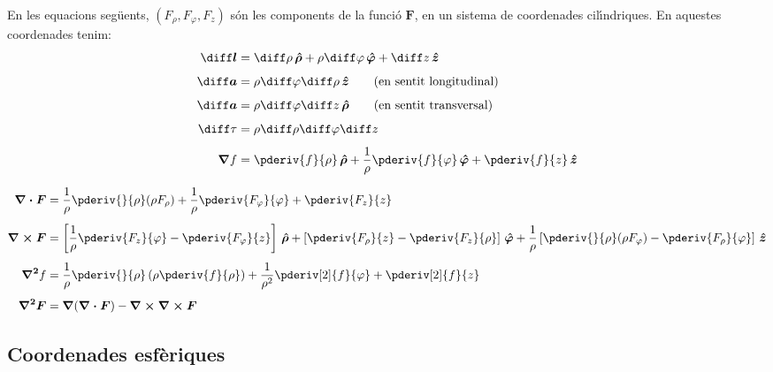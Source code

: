 \documentclass[catalan,a4paper,twoside,11pt]{article}
\begin{document}
\renewcommand{\va}{\ensuremath{\,\boldsymbol{\hat{\rho}}}}
\renewcommand{\vb}{\ensuremath{\,\boldsymbol{\hat{\varphi}}}}
\renewcommand{\vc}{\ensuremath{\,\boldsymbol{\hat{z}}}}
En les equacions seg\"{u}ents, $(F_\rho,F_\varphi,F_z)$  s\'{o}n les
components de la funci\'{o}  $\boldsymbol{F}$, en un sistema de
coordenades cil\'{\i}ndriques. En aquestes coordenades tenim:
\begin{align}
    \boldsymbol{\diff l} &= \diff \rho \va + \rho\diff \varphi \vb + \diff z \vc\\[1ex]
    \boldsymbol{\diff a} &= \rho\diff \varphi \diff \rho \vc \qquad\text{(en sentit longitudinal)}\\[1ex]
    \boldsymbol{\diff a} &= \rho\diff \varphi \diff z \va \qquad\text{(en sentit transversal)}\\[1ex]
    \diff\tau &= \rho \diff \rho \diff \varphi \diff z\\[1ex]
    \boldsymbol{\nabla}f &= \pderiv{f}{\rho}\va + \frac{1}{\rho}\pderiv{f}{\varphi}\vb
    + \pderiv{f}{z}\vc
\end{align}

\begin{align}
    \boldsymbol{\nabla\cdot F} &= \frac{1}{\rho}\pderiv{}{\rho}(\rho F_\rho) +
    \frac{1}{\rho}\pderiv{F_\varphi}{\varphi}+ \pderiv{F_z}{z}\\[1ex]
    \boldsymbol{\nabla\times F} &= \left[\frac{1}{\rho}\pderiv{F_z}{\varphi}-
    \pderiv{F_\varphi}{z}\right]\va +
    \left[\pderiv{F_\rho}{z}-\pderiv{F_z}{\rho}\right]\vb +
    \frac{1}{\rho}\left[\pderiv{}{\rho}(\rho F_\varphi)-\pderiv{F_\rho}{\varphi}\right]\vc\\[1ex]
    \boldsymbol{\nabla^2}f &= \frac{1}{\rho}\pderiv{}{\rho}\left(\rho\pderiv{f}{\rho}
    \right)
    + \frac{1}{\rho^2}\pderiv[2]{f}{\varphi}+ \pderiv[2]{f}{z}\\[1ex]
    \boldsymbol{\nabla^2F} &=\boldsymbol{\nabla}(\boldsymbol{\nabla\cdot
    F}) -\boldsymbol{\nabla\times\nabla\times F}
\end{align}


\subsection{Coordenades esf\`{e}riques}
\end{document}
